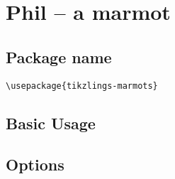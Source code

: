 \documentclass[parskip=half]{scrartcl}
\begin{document}
\begin{tcblisting}{}
\koala[3D]
\end{tcblisting}


\clearpage
\section{Phil -- a marmot}

\subsection{Package name}

\begin{tcolorbox}
\vspace*{0.5cm}
\lstinline|\usepackage{tikzlings-marmots}|
\vspace*{0.5cm}
\end{tcolorbox}

\subsection{Basic Usage}

\begin{tcblisting}{}
\marmot
\end{tcblisting}

\subsection{Options}

\begin{tcblisting}{}
\marmot[body=SteelBlue]
\end{tcblisting}

\begin{tcblisting}{}
\marmot[blush]
\end{tcblisting}

\begin{tcblisting}{}
\marmot[whiskers=gray]
\end{tcblisting}

\begin{tcblisting}{}
\marmot[teeth]
\end{tcblisting}

\begin{tcblisting}{}
\marmot[shadow]
\end{tcblisting}

\begin{tcblisting}{}
\marmot[askphil]
\end{tcblisting}
\end{document}
